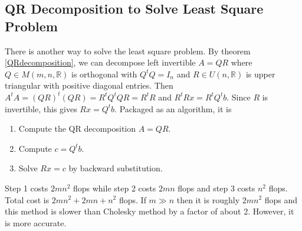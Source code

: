 \documentclass[12pt]{amsart}
\theoremstyle{definition}
\begin{document}
\subsection{QR Decomposition to Solve Least Square Problem} There is another way to solve the least square problem. By theorem \ref{QRdecomposition}, we can decompose left invertible $A = QR$ where $Q \in M(m, n, \mathbb{R})$ is orthogonal with $Q^tQ = I_n$ and $R \in U(n, \mathbb{R})$ is upper triangular with positive diagonal entries. Then $A^tA = (QR)^t(QR) = R^tQ^tQR = R^tR$ and $R^tRx = R^tQ^t b$. Since $R$ is invertible, this gives $Rx = Q^tb$. Packaged as an algorithm, it is
\begin{enumerate}[\indent 1.]
\item Compute the QR decomposition $A = QR$.
\item Compute $c = Q^tb$.
\item Solve $Rx = c$ by backward substitution.
\end{enumerate}

Step 1 costs $2mn^2$ flops while step 2 costs $2mn$ flops and step 3 costs $n^2$ flops. Total cost is $2mn^2 + 2mn + n^2$ flops. If $m \gg n$ then it is roughly $2mn^2$ flops and this method is slower than Cholesky method by a factor of about 2. However, it is more accurate.
\end{document}

